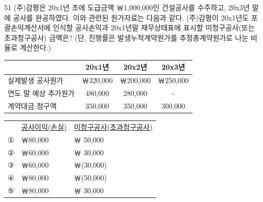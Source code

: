 \begin{question}{51}
(주)감평은 20x1년 초에 도급금액 ￦1,000,000인 건설공사를 수주하고, 20x3년 말에 공사를 완공하였다. 이와 관련된 원가자료는 다음과 같다. (주)감평이 20x1년도 포괄손익계산서에 인식할 공사손익과 20x1년말 재무상태표에 표시할 미청구공사(또는 초과청구공사) 금액은? (단, 진행률은 발생누적계약원가를 추정총계약원가로 나눈 비율로 계산한다.)
\par{\small\centering\begin{tabular}{|l|c|c|c|}
\hline
 & 20x1년 & 20x2년 & 20x3년 \\ \hline
실제발생 공사원가 & ￦320,000 & ￦200,000 & ￦250,000 \\ \hline
연도 말 예상 추가원가 & 480,000 & 280,000 & - \\ \hline
계약대금 청구액 & 350,000 & 350,000 & 300,000 \\ \hline
\end{tabular}\par}
\begin{center}
\begin{tabular}{@{}lll@{}}
 & \uline{공사이익(손실)} & \uline{미청구공사(초과청구공사)} \\
① & ￦80,000 & ￦ 50,000 \\
② & ￦60,000 & ￦ 30,000 \\
③ & ￦60,000 & ￦(30,000) \\
④ & ￦80,000 & ￦(50,000) \\
⑤ & ￦80,000 & ￦ 30,000 \\
\end{tabular}
\end{center}
\end{question}
